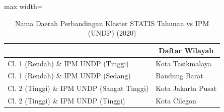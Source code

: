 \begin{table}[H]
\centering
\caption{Nama Daerah Perbandingan Klaster STATIS Tahunan vs IPM (UNDP) (2020)} \label{tab:sample2statis_ipm_name_2020}
\begin{adjustbox}{max width=\textwidth}
\begin{tabular}{|>{\centering\arraybackslash}p{4cm}|p{10cm}|}
\hline
\multicolumn{1}{|c|}{\textbf{Kategori}} & \multicolumn{1}{c|}{\textbf{Daftar Wilayah}} \\
\hline
Cl. 1 (Rendah) \& IPM UNDP (Tinggi) & Kota Tasikmalaya \\
\hline
Cl. 1 (Rendah) \& IPM UNDP (Sedang) & Bandung Barat \\
\hline
Cl. 2 (Tinggi) \& IPM UNDP (Sangat Tinggi) & Kota Jakarta Pusat \\
\hline
Cl. 2 (Tinggi) \& IPM UNDP (Tinggi) & Kota Cilegon \\
\hline
\end{tabular}
\end{adjustbox}
\end{table}